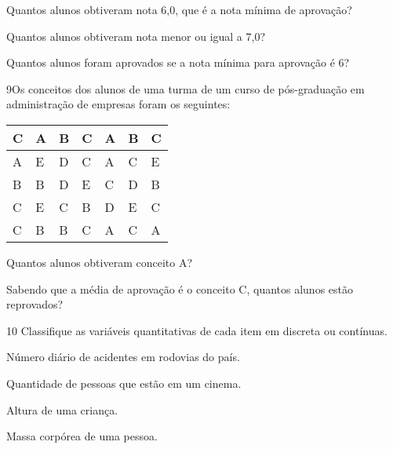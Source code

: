 \begin{escolha}
\item
  Quantos alunos obtiveram nota 6,0, que é a nota mínima de aprovação?


\item
  Quantos alunos obtiveram nota menor ou igual a 7,0?


\item
  Quantos alunos foram aprovados se a nota mínima para aprovação é 6?

\end{escolha}


\num{9}Os conceitos dos alunos de uma turma de um curso de pós-graduação em
administração de empresas foram os seguintes:

\begin{longtable}[]{@{}lllllll@{}}
\toprule
C & A & B & C & A & B & C\tabularnewline
\midrule
\endhead
A & E & D & C & A & C & E\tabularnewline
B & B & D & E & C & D & B\tabularnewline
C & E & C & B & D & E & C\tabularnewline
C & B & B & C & A & C & A\tabularnewline
\bottomrule
\end{longtable}

\begin{escolha}
\item
  Quantos alunos obtiveram conceito A?


\item
  Sabendo que a média de aprovação é o conceito C, quantos alunos estão
  reprovados?

\end{escolha}


\num{10} Classifique as variáveis quantitativas de cada item em discreta ou
contínuas.

\begin{escolha}
\item
  Número diário de acidentes em rodovias do país.


\item
  Quantidade de pessoas que estão em um cinema.


\item
  Altura de uma criança.


\item
  Massa corpórea de uma pessoa.

\end{escolha}

